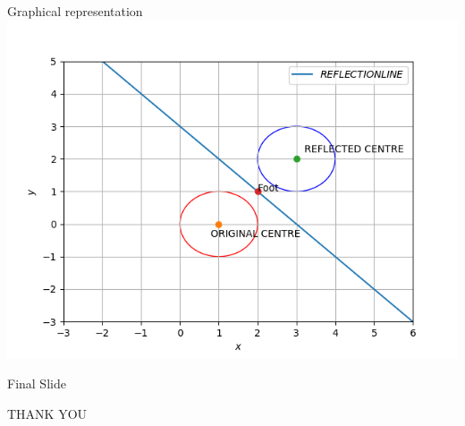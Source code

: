 \documentclass{beamer}
\begin{document}
\begin{frame}{Graphical representation}
\includegraphics[scale =0.6]{Figure_1.png}
\end{frame}

\begin{frame}{Final Slide}
\begin{center}
    THANK YOU
\end{center}
    
\end{frame}
    
\end{document}

